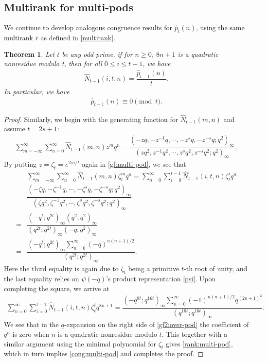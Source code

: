 \documentclass[12pt]{amsart}
\numberwithin{equation}{section}
\theoremstyle{plain}
\newtheorem{theorem}{Theorem}[section]
\theoremstyle{definition}
\begin{document}
\subsection{Multirank for multi-pods}
We continue to develop analogous congruence results for $\hat{p}_t(n)$, using the same multirank $\overline{r}$ as defined in \eqref{multirank}.
\begin{theorem}\label{thm:multi-pod pa}
Let $t$ be any odd prime, if for $n\geq 0$, $8n+1$ is a quadratic nonresidue modulo t, then for all $0\leq i\leq t-1$, we have
\begin{align}\label{rank:multi-pod}
\hat{N}_{t-1}(i,t,n)=\dfrac{\hat{p}_{t-1}(n)}{t}.
\end{align}
In particular, we have
\begin{align}\label{cong:multi-pod}
\hat{p}_{t-1}(n)\equiv 0 \pmod t.
\end{align}
\end{theorem}
\begin{proof}
Similarly, we begin with the generating function for $\hat{N}_{t-1}(m,n)$ and assume $t=2s+1$:
\begin{align}\label{gf:multi-pod}
\sum_{m=-\infty}^{\infty}\sum_{n=0}^{\infty}\hat{N}_{t-1}(m,n)z^{m}q^{n}=
\dfrac{(-zq,-z^{-1}q,\cdots,-z^{s}q,-z^{-s}q;q^{2})_{\infty}}{(zq^{2},z^{-1}q^{2},\cdots,z^{s}q^{2},z^{-s}q^{2};q^{2})_{\infty}},
\end{align}
By putting $z=\zeta_{t}=e^{2\pi i/t}$ again in \eqref{gf:multi-pod}, we see that
\begin{align*}
 &\sum_{m=-\infty}^{\infty}\sum_{n=0}^{\infty}\hat{N}_{t-1}(m,n)\zeta_{t}^{m}q^{n}=\sum_{n=0}^{\infty}\sum_{i=0}^{t-1}\hat{N}_{t-1}(i,t,n)\zeta_{t}^{i}q^{n}\\
 =&\dfrac{(-\zeta q,-\zeta^{-1}q,\cdots,-\zeta^{s}q,-\zeta^{-s}q;q^{2})_{\infty}}{(\zeta q^2,\zeta^{-1}q^{2},\cdots,\zeta^{s}q^{2},\zeta^{-s}q^{2};q^{2})_{\infty}}\nonumber\\
 =&\dfrac{(-q^t;q^{2t})_{\infty}(q^{2};q^{2})_{\infty}}{(q^{2t};q^{2t})_{\infty}(-q;q^{2})_{\infty}}\nonumber\\
 =&\dfrac{(-q^{t};q^{2t})_{\infty}\sum_{n=0}^{\infty}(-q)^{n(n+1)/2}}{(q^{2t};q^{2t})_{\infty}}.
\end{align*}
Here the third equality is again due to $\zeta_{t}$ being a primitive $t$-th root of unity, and the last equality relies on $\psi(-q)$'s product representation \eqref{psi}. Upon completing the square, we arrive at
\begin{align}\label{gf2:over-pod}
\sum_{n=0}^{\infty}\sum_{i=0}^{t-1}\hat{N}_{t-1}(i,t,n)\zeta_{t}^{i}q^{8n+1}=\dfrac{(-q^{8t};q^{16t})_{\infty}\sum_{n=0}^{\infty}(-1)^{n(n+1)/2}q^{(2n+1)^2}}{(q^{16t};q^{16t})_{\infty}}.
\end{align}
We see that in the $q$-expansion on the right side of \eqref{gf2:over-pod} the coefficient of $q^{n}$ is zero when $n$ is a quadratic nonresidue modulo $t$. This together with a similar argument using the minimal polynomial for $\zeta_t$ gives \eqref{rank:multi-pod}, which in turn implies \eqref{cong:multi-pod} and completes the proof.
\end{proof}
\end{document}
